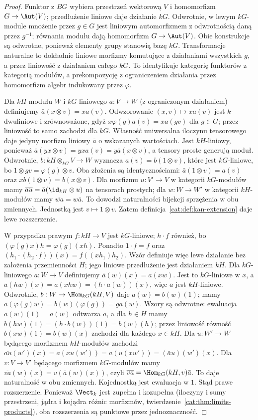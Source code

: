 \begin{proof}
Funktor z $BG$ wybiera przestrzeń wektorową $V$ i homomorfizm $G\to\Aut(V)$; przedłużenie liniowe daje działanie $kG$. Odwrotnie, w lewym $kG$-module mnożenie przez $g\in G$ jest liniowym automorfizmem z odwrotnością daną przez $g^{-1}$; równania modułu dają homomorfizm $G\to\Aut(V)$. Obie konstrukcje są odwrotne, ponieważ elementy grupy stanowią bazę $kG$. Transformacje naturalne to dokładnie liniowe morfizmy komutujące z działaniami wszystkich $g$, a przez liniowość z działaniem całego $kG$. To identyfikuje kategorię funktorów z kategorią modułów, a prekompozycję z ograniczeniem działania przez homomorfizm algebr indukowany przez $\varphi$.

Dla $kH$-modułu $W$ i $kG$-liniowego $a:V\to W$ (z ograniczonym działaniem) definiujemy $\bar a(x\otimes v)=xa(v)$. Odwzorowanie $(x,v)\mapsto xa(v)$ jest $k$-dwuliniowe i zrównoważone, gdyż $x\varphi(g)a(v)=xa(gv)$ dla $g\in G$; przez liniowość to samo zachodzi dla $kG$. Własność uniwersalna iloczynu tensorowego daje jedyny morfizm liniowy $\bar a$ o wskazanych wartościach. Jest $kH$-liniowy, ponieważ $\bar a(yx\otimes v)=yx a(v)=y\bar a(x\otimes v)$, a tensory proste generują moduł. Odwrotnie, $b:kH\otimes_{kG}V\to W$ wyznacza $a(v)=b(1\otimes v)$, które jest $kG$-liniowe, bo $1\otimes gv=\varphi(g)\otimes v$. Oba złożenia są identycznościami: $\bar a(1\otimes v)=a(v)$ oraz $x b(1\otimes v)=b(x\otimes v)$. Dla morfizmu $u:V'\to V$ w kategorii $kG$-modułów mamy $\overline{au}=\bar a(\id_{kH}\otimes u)$ na tensorach prostych; dla $w:W\to W'$ w kategorii $kH$-modułów mamy $\overline{wa}=w\bar a$. To dowodzi naturalności bijekcji sprzężenia w obu zmiennych. Jednostką jest $v\mapsto1\otimes v$. Zatem definicja~\ref{cat:def:kan-extension} daje lewe rozszerzenie.

W przypadku prawym $f:kH\to V$ jest $kG$-liniowe; $h\cdot f$ również, bo $(\varphi(g)x)h=\varphi(g)(xh)$. Ponadto $1\cdot f=f$ oraz $(h_1\cdot(h_2\cdot f))(x)=f((xh_1)h_2)$. Wzór definiuje więc lewe działanie bez założenia przemienności $H$; jego liniowe przedłużenie jest działaniem $kH$. Dla $kG$-liniowego $a:W\to V$ definiujemy $\bar a(w)(x)=a(xw)$. Jest to $kG$-liniowe w $x$, a $\bar a(hw)(x)=a(xhw)=(h\cdot\bar a(w))(x)$, więc $\bar a$ jest $kH$-liniowe. Odwrotnie, $b:W\to\Hom_{kG}(kH,V)$ daje $a(w)=b(w)(1)$; mamy $a(\varphi(g)w)=b(w)(\varphi(g))=ga(w)$. Wzory są odwrotne: ewaluacja $\bar a(w)(1)=a(w)$ odtwarza $a$, a dla $h\in H$ mamy $b(hw)(1)=(h\cdot b(w))(1)=b(w)(h)$; przez liniowość równość $b(xw)(1)=b(w)(x)$ zachodzi dla każdego $x\in kH$. Dla $u:W'\to W$ będącego morfizmem $kH$-modułów zachodzi $\overline{au}(w')(x)=a(xu(w'))=a(u(xw'))=(\bar a u)(w')(x)$. Dla $v:V\to V'$ będącego morfizmem $kG$-modułów mamy $\overline{va}(w)(x)=v(\bar a(w)(x))$, czyli $\overline{va}=\Hom_{kG}(kH,v)\bar a$. To daje naturalność w obu zmiennych. Kojednostką jest ewaluacja w $1$. Stąd prawe rozszerzenie. Ponieważ $\Vect_k$ jest zupełna i kozupełna (iloczyny i sumy przestrzeni, jądra i kojądra różnic morfizmów, twierdzenie~\ref{cat:thm:limits-products}), oba rozszerzenia są punktowe przez jednoznaczność.
\end{proof}

